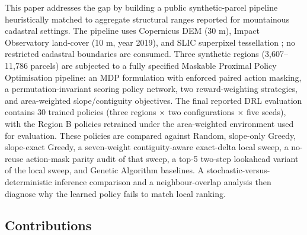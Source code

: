 \documentclass[]{interact}
\theoremstyle{plain}
\begin{document}
This paper addresses the gap by building a public synthetic-parcel pipeline heuristically matched to aggregate structural ranges reported for mountainous cadastral settings. The pipeline uses Copernicus DEM (30 m), Impact Observatory land-cover \citep{karra2021global} (10 m, year 2019), and SLIC superpixel tessellation \citep{achanta2012slic}; no restricted cadastral boundaries are consumed. Three synthetic regions (3{,}607--11{,}786 parcels) are subjected to a fully specified Maskable Proximal Policy Optimisation pipeline: an MDP formulation with enforced paired action masking, a permutation-invariant scoring policy network, two reward-weighting strategies, and area-weighted slope/contiguity objectives. The final reported DRL evaluation contains 30 trained policies (three regions $\times$ two configurations $\times$ five seeds), with the Region B policies retrained under the area-weighted environment used for evaluation. These policies are compared against Random, slope-only Greedy, slope-exact Greedy, a seven-weight contiguity-aware exact-delta local sweep, a no-reuse action-mask parity audit of that sweep, a top-5 two-step lookahead variant of the local sweep, and Genetic Algorithm baselines. A stochastic-versus-deterministic inference comparison and a neighbour-overlap analysis then diagnose why the learned policy fails to match local ranking.

\subsection{Contributions}
\end{document}

